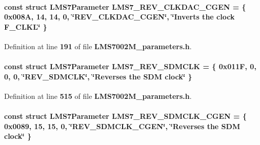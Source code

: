 \paragraph[{L\+M\+S7\+\_\+\+R\+E\+V\+\_\+\+C\+L\+K\+D\+A\+C\+\_\+\+C\+G\+EN}]{\setlength{\rightskip}{0pt plus 5cm}const struct {\bf L\+M\+S7\+Parameter} L\+M\+S7\+\_\+\+R\+E\+V\+\_\+\+C\+L\+K\+D\+A\+C\+\_\+\+C\+G\+EN = \{ 0x008\+A, 14, 14, 0, \char`\"{}\+R\+E\+V\+\_\+\+C\+L\+K\+D\+A\+C\+\_\+\+C\+G\+E\+N\char`\"{}, \char`\"{}\+Inverts the clock F\+\_\+\+C\+L\+K\+L\char`\"{} \}\hspace{0.3cm}{\ttfamily [static]}}\label{LMS7002M__parameters_8h_a78d51bdd4bc3363183ed1d118dfdfb41}


Definition at line {\bf 191} of file {\bf L\+M\+S7002\+M\+\_\+parameters.\+h}.

\paragraph[{L\+M\+S7\+\_\+\+R\+E\+V\+\_\+\+S\+D\+M\+C\+LK}]{\setlength{\rightskip}{0pt plus 5cm}const struct {\bf L\+M\+S7\+Parameter} L\+M\+S7\+\_\+\+R\+E\+V\+\_\+\+S\+D\+M\+C\+LK = \{ 0x011\+F, 0, 0, 0, \char`\"{}\+R\+E\+V\+\_\+\+S\+D\+M\+C\+L\+K\char`\"{}, \char`\"{}\+Reverses the S\+D\+M clock\char`\"{} \}\hspace{0.3cm}{\ttfamily [static]}}\label{LMS7002M__parameters_8h_a4583ea6c26abbbb8de615ed6227ee93c}


Definition at line {\bf 515} of file {\bf L\+M\+S7002\+M\+\_\+parameters.\+h}.

\paragraph[{L\+M\+S7\+\_\+\+R\+E\+V\+\_\+\+S\+D\+M\+C\+L\+K\+\_\+\+C\+G\+EN}]{\setlength{\rightskip}{0pt plus 5cm}const struct {\bf L\+M\+S7\+Parameter} L\+M\+S7\+\_\+\+R\+E\+V\+\_\+\+S\+D\+M\+C\+L\+K\+\_\+\+C\+G\+EN = \{ 0x0089, 15, 15, 0, \char`\"{}\+R\+E\+V\+\_\+\+S\+D\+M\+C\+L\+K\+\_\+\+C\+G\+E\+N\char`\"{}, \char`\"{}\+Reverses the S\+D\+M clock\char`\"{} \}\hspace{0.3cm}{\ttfamily [static]}}\label{LMS7002M__parameters_8h_a843c1fa0f9992918b1fac07495266b7d}


